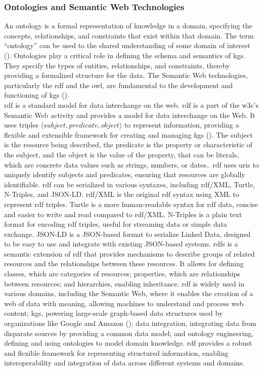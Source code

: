 \subsubsection*{Ontologies and Semantic Web Technologies}
An ontology is a formal representation of knowledge in a domain, specifying the concepts, relationships, and constraints that exist within that domain. The term ``ontology'' can be used to the shared understanding of some domain of interest (\cite{Uschold1996}).
Ontologies play a critical role in defining the schema and semantics of \glspl{kg}. They specify the types of entities, relationships, and constraints, thereby providing a formalized structure for the data. The Semantic Web technologies, particularly the \gls{rdf} and the \gls{owl}, are fundamental to the development and functioning of \glspl{kg} (\cite{Antoniou2008}).
\\\gls{rdf} is a standard model for data interchange on the web.
\gls{rdf} is a part of the \gls{w3c}'s Semantic Web activity and provides a model for data interchange on the Web.
It uses triples $\langle subject,predicate,object \rangle$ to represent information, providing a flexible and extensible framework for creating and managing \glspl{kg} (\cite{Cyganiak14RCA}).
The subject is the resource being described, the predicate is the property or characteristic of the subject, and the object is the value of the property, that can be literals, which are concrete data values such as strings, numbers, or dates..
\gls{rdf} uses \glspl{uri} to uniquely identify subjects and predicates, ensuring that resources are globally identifiable.
\gls{rdf} can be serialized in various syntaxes, including \gls{rdf}/XML, Turtle, N-Triples, and JSON-LD. \gls{rdf}/XML is the original \gls{rdf} syntax using XML to represent \gls{rdf} triples. Turtle is a more human-readable syntax for \gls{rdf} data, concise and easier to write and read compared to \gls{rdf}/XML. N-Triples is a plain text format for encoding \gls{rdf} triples, useful for streaming data or simple data exchange. JSON-LD is a JSON-based format to serialize Linked Data, designed to be easy to use and integrate with existing JSON-based systems.
\gls{rdfs} is a semantic extension of \gls{rdf} that provides mechanisms to describe groups of related resources and the relationships between these resources. It allows for defining classes, which are categories of resources; properties, which are relationships between resources; and hierarchies, enabling inheritance.
\gls{rdf} is widely used in various domains, including the Semantic Web, where it enables the creation of a web of data with meaning, allowing machines to understand and process web content; \glspl{kg}, powering large-scale graph-based data structures used by organizations like Google and Amazon (\cite{Kejriwal2022}); data integration, integrating data from disparate sources by providing a common data model; and ontology engineering, defining and using ontologies to model domain knowledge. \gls{rdf} provides a robust and flexible framework for representing structured information, enabling interoperability and integration of data across different systems and domains.
